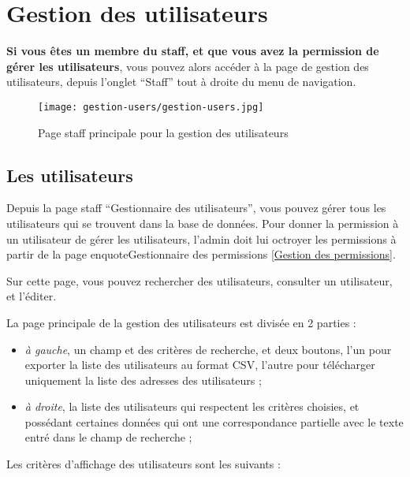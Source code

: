 \section{Gestion des utilisateurs}

\textbf{Si vous êtes un membre du staff, et que vous avez la permission de gérer les utilisateurs}, vous pouvez alors accéder à la page de gestion des utilisateurs, depuis l'onglet \enquote{Staff} tout à droite du menu de navigation.

\begin{figure}[H]
\centering
\texttt{[image: gestion-users/gestion-users.jpg]}
\caption{Page staff principale pour la gestion des utilisateurs}
\end{figure}

\subsection{Les utilisateurs}

Depuis la page staff \enquote{Gestionnaire des utilisateurs}, vous pouvez gérer tous les utilisateurs qui se trouvent dans la base de données. Pour donner la permission à un utilisateur de gérer les utilisateurs, l'admin doit lui octroyer les permissions à partir de la page enquote{Gestionnaire des permissions} \ref{Gestion des permissions}.\newline

Sur cette page, vous pouvez rechercher des utilisateurs, consulter un utilisateur, et l'éditer.\newline

La page principale de la gestion des utilisateurs est divisée en 2 parties :

\begin{itemize}
\item \textit{à gauche}, un champ et des critères de recherche, et deux boutons, l'un pour exporter la liste des utilisateurs au format CSV, l'autre pour télécharger uniquement la liste des adresses des utilisateurs ;
\item \textit{à droite}, la liste des utilisateurs qui respectent les critères choisies, et possédant certaines données qui ont une correspondance partielle avec le texte entré dans le champ de recherche ;
\end{itemize}
\bigskip

Les critères d'affichage des utilisateurs sont les suivants :

